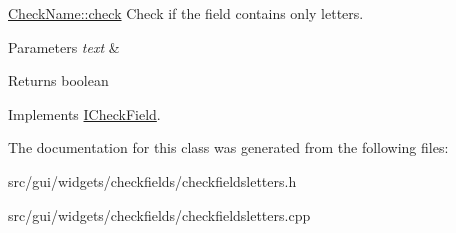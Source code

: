 \hyperlink{classCheckFieldsLetters_a62574deb407fe83456e46381425a7b46}{Check\+Name\+::check} Check if the field contains only letters. 


\begin{DoxyParams}{Parameters}
{\em text} & \\
\hline
\end{DoxyParams}
\begin{DoxyReturn}{Returns}
boolean 
\end{DoxyReturn}


Implements \hyperlink{classICheckField_a6bd42b4d49c165cdd92822135123fd4b}{I\+Check\+Field}.



The documentation for this class was generated from the following files\+:\begin{DoxyCompactItemize}
\item 
src/gui/widgets/checkfields/checkfieldsletters.\+h\item 
src/gui/widgets/checkfields/checkfieldsletters.\+cpp\end{DoxyCompactItemize}
